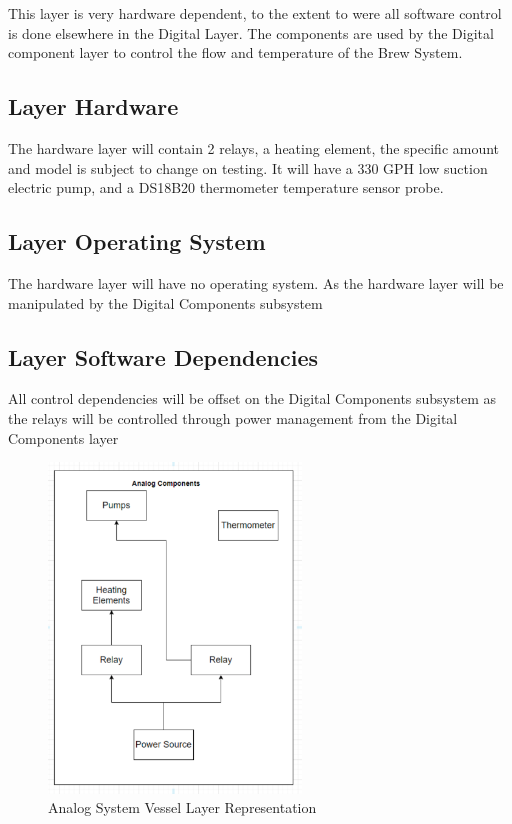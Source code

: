 This layer is very hardware dependent, to the extent to were all software control is done elsewhere in the Digital Layer. The  components are used by the Digital component layer to control the flow and temperature of the Brew System.

\subsection{Layer Hardware}
The hardware layer will contain 2 relays, a heating element, the specific amount and model is subject to change on testing. It will have a 330 GPH low suction electric pump, and a DS18B20 thermometer temperature sensor probe.  


\subsection{Layer Operating System}
The hardware layer will have no operating system. As the hardware layer will be manipulated by the Digital Components subsystem

\subsection{Layer Software Dependencies}
All control dependencies will be offset on the Digital Components subsystem as the relays will be controlled through power management from the Digital Components layer

\begin{figure}[h!]
	\centering
	\includegraphics[width=0.60\textwidth]{images/Analog_System_Vessels.png}
	\caption{Analog System Vessel Layer Representation}
\end{figure}



